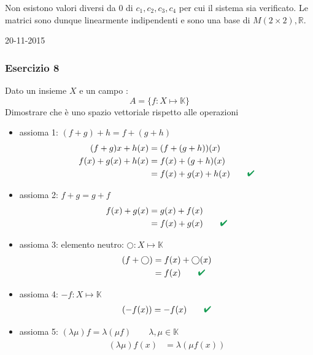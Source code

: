 \documentclass[italian]{article}
\renewcommand{\checkmark}{\textcolor{ForestGreen}{\text{$\qquad$\ding{52}}}}
\newcommand{\ins}[1]{\text{$\mathbb{#1}$}}
\newcommand{\tright}[1]{\hfill #1 \\}
\begin{document}
Non esistono valori diversi da 0 di $c_1,c_2,c_3,c_4$ per cui il sistema sia verificato. Le matrici sono dunque linearmente indipendenti e sono una base di $M(2\times 2), \ins{R}$.

\tright{20-11-2015}
\subsubsection{Esercizio 8}
Dato un insieme $X$ e un campo \ins{K}:
\[
	A = \{ f: X \longmapsto \ins{K} \}
\]
Dimostrare che è uno spazio vettoriale rispetto alle operazioni
\begin{itemize}
	\item assioma 1: $(f+g) + h = f + (g+h)$
		\begin{gather*}
			\begin{split}
				(f+g)x + h(x) &= (f+(g+h))(x) \\
				f(x) + g(x) + h(x) &= f(x) + (g+h)(x) \\
				&= f(x) + g(x) + h(x) \checkmark
			\end{split}
		\end{gather*}
		\item assioma 2: $f + g = g + f $
			\begin{gather*}
			\begin{split}
				f(x) + g(x) &= g(x) + f(x) \\
				&= f(x) + g(x) \checkmark
			\end{split}
			\end{gather*}
		\item assioma 3: elemento neutro: $ \bigcirc: X \longmapsto \ins{K} $
			\begin{gather*}
				\begin{split}
					(f + \bigcirc) &= f(x) + \bigcirc(x) \\
					&= f(x) \checkmark
				\end{split}
			\end{gather*}
		\item assioma 4: $ -f: X \longmapsto \ins{K} $
			\begin{gather*}
				\begin{split}
					(-f(x)) = -f(x) \checkmark
				\end{split}
			\end{gather*}
		\item assioma 5: $ (\lambda\mu)f = \lambda(\mu f) \qquad \lambda,\mu \in \ins{K}$
			\begin{gather*}
				\begin{split}
					(\lambda\mu)f(x) &= \lambda(\mu f(x)) \\

\end{split}
\end{gather*}
\end{itemize}
\end{document}
